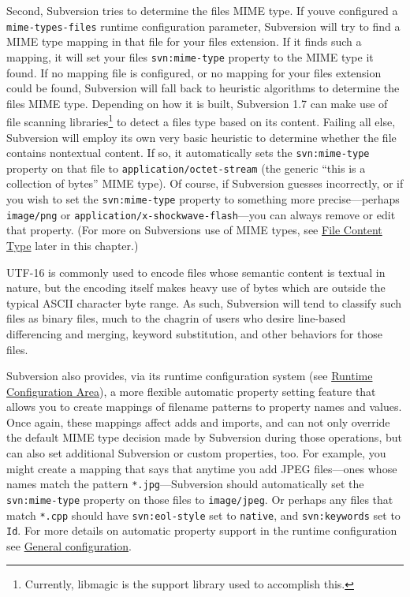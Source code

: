 Second, Subversion tries to determine the file\textquotesingle s MIME
type. If you\textquotesingle ve configured a \texttt{mime-types-files}
runtime configuration parameter, Subversion will try to find a MIME type
mapping in that file for your file\textquotesingle s extension. If it
finds such a mapping, it will set your file\textquotesingle s
\texttt{svn:mime-type} property to the MIME type it found. If no mapping
file is configured, or no mapping for your file\textquotesingle s
extension could be found, Subversion will fall back to heuristic
algorithms to determine the file\textquotesingle s MIME type. Depending
on how it is built, Subversion 1.7 can make use of file scanning
libraries\footnote{Currently, libmagic is the support library used to
  accomplish this.} to detect a file\textquotesingle s type based on its
content. Failing all else, Subversion will employ its own very basic
heuristic to determine whether the file contains nontextual content. If
so, it automatically sets the \texttt{svn:mime-type} property on that
file to \texttt{application/octet-stream} (the generic ``this is a
collection of bytes'' MIME type). Of course, if Subversion guesses
incorrectly, or if you wish to set the \texttt{svn:mime-type} property
to something more precise---perhaps \texttt{image/png} or
\texttt{application/x-shockwave-flash}---you can always remove or edit
that property. (For more on Subversion\textquotesingle s use of MIME
types, see \hyperref[svn.advanced.props.special.mime-type]{File Content
Type} later in this chapter.)

UTF-16 is commonly used to encode files whose semantic content is
textual in nature, but the encoding itself makes heavy use of bytes
which are outside the typical ASCII character byte range. As such,
Subversion will tend to classify such files as binary files, much to the
chagrin of users who desire line-based differencing and merging, keyword
substitution, and other behaviors for those files.

Subversion also provides, via its runtime configuration system (see
\hyperref[svn.advanced.confarea]{Runtime Configuration Area}), a more
flexible automatic property setting feature that allows you to create
mappings of filename patterns to property names and values. Once again,
these mappings affect adds and imports, and can not only override the
default MIME type decision made by Subversion during those operations,
but can also set additional Subversion or custom properties, too. For
example, you might create a mapping that says that anytime you add JPEG
files---ones whose names match the pattern \texttt{*.jpg}---Subversion
should automatically set the \texttt{svn:mime-type} property on those
files to \texttt{image/jpeg}. Or perhaps any files that match
\texttt{*.cpp} should have \texttt{svn:eol-style} set to
\texttt{native}, and \texttt{svn:keywords} set to \texttt{Id}. For more
details on automatic property support in the runtime configuration see
\hyperref[svn.advanced.confarea.opts.config]{General configuration}.

